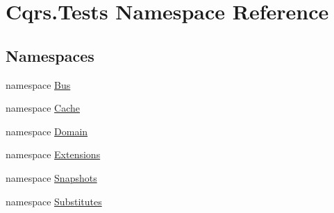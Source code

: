 \hypertarget{namespaceCqrs_1_1Tests}{}\section{Cqrs.\+Tests Namespace Reference}
\label{namespaceCqrs_1_1Tests}
\subsection*{Namespaces}
\begin{DoxyCompactItemize}
\item 
namespace \hyperlink{namespaceCqrs_1_1Tests_1_1Bus}{Bus}
\item 
namespace \hyperlink{namespaceCqrs_1_1Tests_1_1Cache}{Cache}
\item 
namespace \hyperlink{namespaceCqrs_1_1Tests_1_1Domain}{Domain}
\item 
namespace \hyperlink{namespaceCqrs_1_1Tests_1_1Extensions}{Extensions}
\item 
namespace \hyperlink{namespaceCqrs_1_1Tests_1_1Snapshots}{Snapshots}
\item 
namespace \hyperlink{namespaceCqrs_1_1Tests_1_1Substitutes}{Substitutes}
\end{DoxyCompactItemize}
